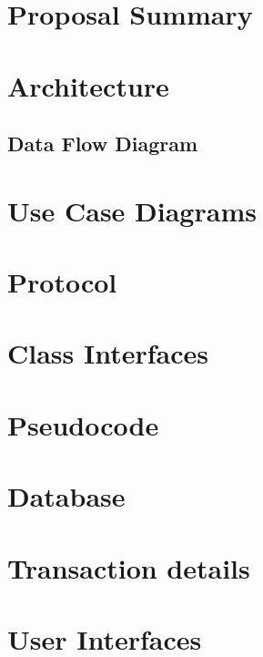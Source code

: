 \chapter{Proposal Summary}


\chapter{Architecture}


\section{Data Flow Diagram}


\chapter{Use Case Diagrams}


\chapter{Protocol}


\chapter{Class Interfaces}


\chapter{Pseudocode}


\chapter{Database}


\chapter{Transaction details}


\chapter{User Interfaces}


